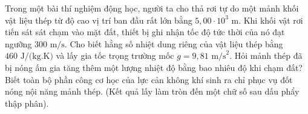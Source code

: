 \begin{ex}%
	Trong một bài thí nghiệm động học, người ta cho thả rơi tự do một mảnh khối vật liệu thép từ độ cao vị trí ban đầu rất lớn bằng $5,00 \cdot 10^3\text{ m}$. Khi khối vật rơi tiến sát sát chạm vào mặt đất, thiết bị ghi nhận tốc độ tức thời của nó đạt ngưỡng $300\text{ m/s}$. Cho biết hằng số nhiệt dung riêng của vật liệu thép bằng $460\text{ J/(kg.K)}$ và lấy gia tốc trọng trường mốc $g = 9,81\text{ m/s}^2$. Hỏi mảnh thép đã bị nóng ấm gia tăng thêm một lượng nhiệt độ bằng bao nhiêu độ khi chạm đất? Biết toàn bộ phần công cơ học của lực cản không khí sinh ra chỉ phục vụ đốt nóng nội năng mảnh thép. (Kết quả lấy làm tròn đến một chữ số sau dấu phẩy thập phân).
\end{ex}

